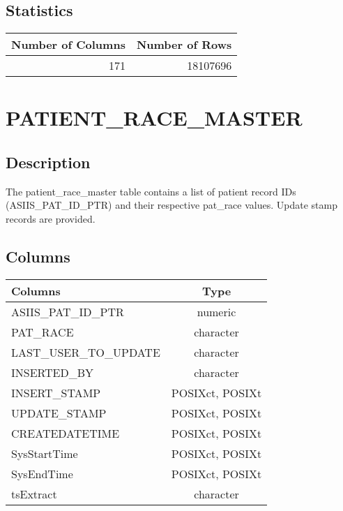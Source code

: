 \documentclass[
  letterpaper,
  DIV=11,
  numbers=noendperiod]{scrreprt}
\begin{document}
\hypertarget{statistics-27}{%
\section*{Statistics}\label{statistics-27}}

\begin{longtable}{rr}
\toprule
Number of Columns & Number of Rows \\ 
\midrule
171 & 18107696 \\ 
\bottomrule
\end{longtable}

\hypertarget{patient_race_master}{%
\chapter*{PATIENT\_RACE\_MASTER}\label{patient_race_master}}

\hypertarget{description-28}{%
\section*{Description}\label{description-28}}

The patient\_race\_master table contains a list of patient record IDs
(ASIIS\_PAT\_ID\_PTR) and their respective pat\_race values. Update
stamp records are provided.

\hypertarget{columns-28}{%
\section*{Columns}\label{columns-28}}

\begin{longtable}{lc}
\toprule
Columns & Type \\ 
\midrule
ASIIS\_PAT\_ID\_PTR & numeric \\ 
PAT\_RACE & character \\ 
LAST\_USER\_TO\_UPDATE & character \\ 
INSERTED\_BY & character \\ 
INSERT\_STAMP & POSIXct, POSIXt \\ 
UPDATE\_STAMP & POSIXct, POSIXt \\ 
CREATEDATETIME & POSIXct, POSIXt \\ 
SysStartTime & POSIXct, POSIXt \\ 
SysEndTime & POSIXct, POSIXt \\ 
tsExtract & character \\ 
\bottomrule
\end{longtable}
\end{document}
